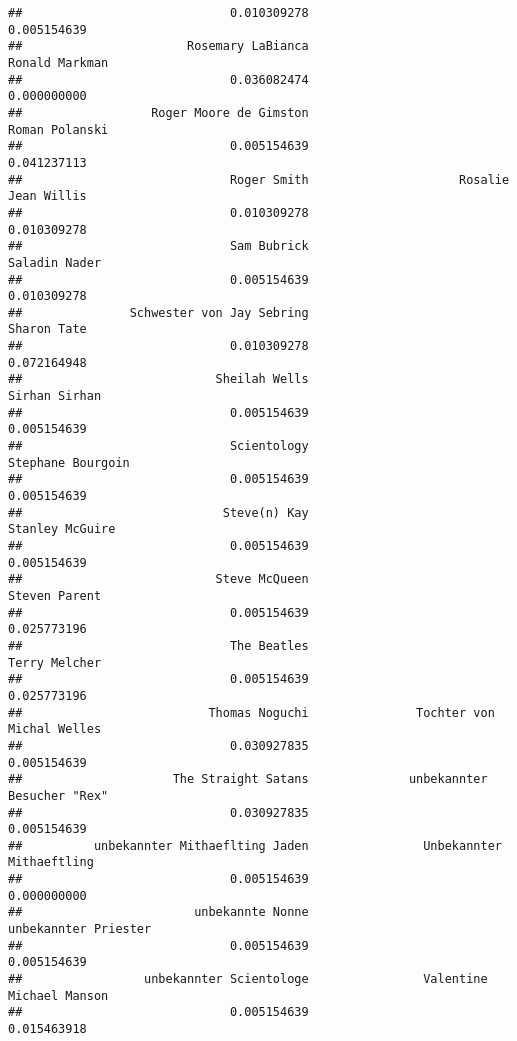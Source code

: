 \documentclass[
]{article}
\begin{document}
\begin{verbatim}
##                             0.010309278                             0.005154639 
##                       Rosemary LaBianca                          Ronald Markman 
##                             0.036082474                             0.000000000 
##                  Roger Moore de Gimston                          Roman Polanski 
##                             0.005154639                             0.041237113 
##                             Roger Smith                     Rosalie Jean Willis 
##                             0.010309278                             0.010309278 
##                             Sam Bubrick                           Saladin Nader 
##                             0.005154639                             0.010309278 
##               Schwester von Jay Sebring                             Sharon Tate 
##                             0.010309278                             0.072164948 
##                           Sheilah Wells                           Sirhan Sirhan 
##                             0.005154639                             0.005154639 
##                             Scientology                       Stephane Bourgoin 
##                             0.005154639                             0.005154639 
##                            Steve(n) Kay                         Stanley McGuire 
##                             0.005154639                             0.005154639 
##                           Steve McQueen                           Steven Parent 
##                             0.005154639                             0.025773196 
##                             The Beatles                           Terry Melcher 
##                             0.005154639                             0.025773196 
##                          Thomas Noguchi               Tochter von Michal Welles 
##                             0.030927835                             0.005154639 
##                     The Straight Satans              unbekannter Besucher "Rex" 
##                             0.030927835                             0.005154639 
##          unbekannter Mithaeflting Jaden                Unbekannter Mithaeftling 
##                             0.005154639                             0.000000000 
##                        unbekannte Nonne                    unbekannter Priester 
##                             0.005154639                             0.005154639 
##                 unbekannter Scientologe                Valentine Michael Manson 
##                             0.005154639                             0.015463918 

\end{verbatim}
\end{document}
